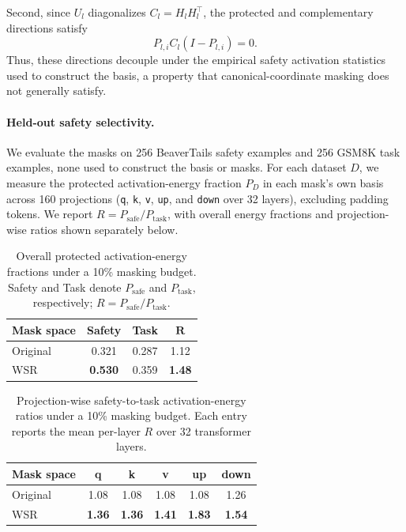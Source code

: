 \documentclass{article}
\begin{document}
Second, since $U_l$ diagonalizes $C_l=H_lH_l^\top$, the protected and complementary directions satisfy
\begin{equation}
    P_{l,i}C_l(I-P_{l,i})=0.
\end{equation}
Thus, these directions decouple under the empirical safety activation statistics used to construct the basis, a property that canonical-coordinate masking does not generally satisfy.

\paragraph{Held-out safety selectivity.}
We evaluate the masks on 256 BeaverTails safety examples and 256 GSM8K task examples, none used to construct the basis or masks. For each dataset $D$, we measure the protected activation-energy fraction $P_D$ in each mask's own basis across 160 projections (\texttt{q}, \texttt{k}, \texttt{v}, \texttt{up}, and \texttt{down} over 32 layers), excluding padding tokens. We report $R=P_{\mathrm{safe}}/P_{\mathrm{task}}$, with overall energy fractions and projection-wise ratios shown separately below.

\begin{table}[H]
\centering
\caption{
Overall protected activation-energy fractions under a 10\% masking budget. Safety and Task denote $P_{\mathrm{safe}}$ and
$P_{\mathrm{task}}$, respectively; $R=P_{\mathrm{safe}}/P_{\mathrm{task}}$.
}
\label{tab:protected_energy_overall}
\begin{tabular}{lccc}
\toprule
\textbf{Mask space} & \textbf{Safety} & \textbf{Task} & $\boldsymbol{R}$ \\
\midrule
Original & 0.321 & 0.287 & 1.12 \\
WSR & \textbf{0.530} & 0.359 & \textbf{1.48} \\
\bottomrule
\end{tabular}
\end{table}

\begin{table}[H]
\centering
\caption{
Projection-wise safety-to-task activation-energy ratios under a 10\% masking budget. Each entry reports the mean per-layer $R$ over 32 transformer layers.
}
\label{tab:protected_energy_projection}
\begin{tabular}{lccccc}
\toprule
\textbf{Mask space}
& \textbf{q} & \textbf{k} & \textbf{v}
& \textbf{up} & \textbf{down} \\
\midrule
Original & 1.08 & 1.08 & 1.08 & 1.08 & 1.26 \\
WSR & \textbf{1.36} & \textbf{1.36} & \textbf{1.41}
& \textbf{1.83} & \textbf{1.54} \\
\bottomrule
\end{tabular}
\end{table}
\end{document}
